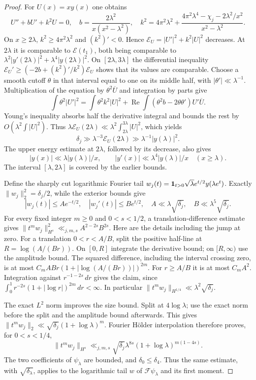 \begin{proof}
For $U(x)=xy(x)$ one obtains
\[
 U''+bU'+k^2U=0,\quad
 b=\frac{2\lambda^2}{x(x^2-\lambda^2)},\quad
 k^2=4\pi^2\lambda^2+
 \frac{4\pi^2\lambda^4-\chi_j-2\lambda^2/x^2}{x^2-\lambda^2}.
\]
On $x\ge2\lambda$, $k^2\ge4\pi^2\lambda^2$ and $(k^2)'<0$.
Hence $\mathcal E_U=|U'|^2+k^2|U|^2$ decreases.
At $2\lambda$ it is comparable to $\mathcal E(t_1)$, both being
comparable to
$\lambda^2|y'(2\lambda)|^2+\lambda^4|y(2\lambda)|^2$.
On $[2\lambda,3\lambda]$ the differential inequality
$\mathcal E_U'\ge(-2b+(k^2)'/k^2)\mathcal E_U$ shows that its
values are comparable. Choose a smooth cutoff $\theta$ in that
interval equal to one on its middle half, with
$|\theta'|\ll\lambda^{-1}$. Multiplication of the equation by
$\theta^2\overline U$ and integration by parts give
\[
 \int\theta^2|U'|^2
 =\int\theta^2k^2|U|^2+
  \operatorname{Re}\int(\theta^2b-2\theta\theta')U'\overline U.
\]
Young's inequality absorbs half the derivative integral and bounds
the rest by $O(\lambda^2\int|U|^2)$. Thus
$\lambda\mathcal E_U(2\lambda)
\ll\lambda^2\int_{2\lambda}^{3\lambda}|U|^2$, which yields
\[
 \delta_j\gg\lambda^{-3}\mathcal E_U(2\lambda)
                  \gg\lambda^{-1}|y(\lambda)|^2.
\]
The upper energy estimate at $2\lambda$, followed by its decrease,
also gives
\[
 |y(x)|\ll\lambda|y(\lambda)|/x,\qquad
 |y'(x)|\ll\lambda^4|y(\lambda)|/x\quad(x\ge\lambda).
\]
The interval $[\lambda,2\lambda]$ is covered by the earlier bounds.

Define the sharply cut logarithmic Fourier tail
$w_j(t)={\bf1}_{t>0}\sqrt\lambda e^{t/2}y(\lambda e^t)$.
Exactly $\|w_j\|_2^2=\delta_j/2$, while the exterior bounds give
\[
 |w_j(t)|\le A e^{-t/2},\quad |w_j'(t)|\le B e^{t/2},\quad
 A\ll\lambda\sqrt{\delta_j},\quad
 B\ll\lambda^5\sqrt{\delta_j}.
\]
For every fixed integer $m\ge0$ and $0<s<1/2$, a translation-difference
estimate gives
$\|t^mw_j\|_{H^s}^2\ll_{j,m,s}A^{2-2s}B^{2s}$.
Here are the details including the jump at zero. For a translation
$0<r<A/B$, split the positive half-line at
$R=\log(A/(Br))$. On $[0,R]$ integrate the derivative bound; on
$[R,\infty)$ use the amplitude bound. The squared difference,
including the interval crossing zero, is at most
$C_mABr(1+|\log(A/(Br))|)^{2m}$.
For $r\ge A/B$ it is at most $C_mA^2$.
Integration against $r^{-1-2s}\,dr$ gives the claim, since
$\int_0^1r^{-2s}(1+|\log r|)^{2m}\,dr<\infty$.
In particular $\|t^mw_j\|_{H^{1/4}}\ll\lambda^2\sqrt{\delta_j}$.

The exact $L^2$ norm improves the size bound. Split at $4\log\lambda$;
use the exact norm before the split and the amplitude bound afterwards.
This gives
$\|t^mw_j\|_2\ll\sqrt{\delta_j}(1+\log\lambda)^m$.
Fourier H\"older interpolation therefore proves, for $0<s<1/4$,
\begin{equation}
 \|t^mw_j\|_{H^s}
 \ll_{j,m,s}\sqrt{\delta_j}\lambda^{8s}
                     (1+\log\lambda)^{m(1-4s)}.
 \label{eq:prolate-log-tail}
\end{equation}
The two coefficients of $\psi_\lambda$ are bounded, and
$\delta_0\le\delta_4$. Thus the same estimate, with
$\sqrt{\delta_\lambda}$, applies to the logarithmic tail $w$ of
$\mathcal F\psi_\lambda$ and its first moment.


\end{proof}
